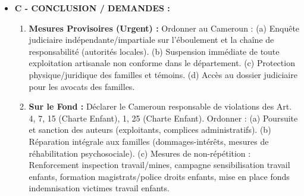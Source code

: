 \documentclass[11pt]{article}
\begin{document}
\begin{exoresolu}
\begin{itemize}
\begin{itemize}
            \end{itemize}
        \item \textbf{C - CONCLUSION / DEMANDES :}
            \begin{enumerate}
                \item \textbf{Mesures Provisoires (Urgent) :} Ordonner au Cameroun : (a) Enquête judiciaire indépendante/impartiale sur l'éboulement et la chaîne de responsabilité (autorités locales). (b) Suspension immédiate de toute exploitation artisanale non conforme dans le département. (c) Protection physique/juridique des familles et témoins. (d) Accès au dossier judiciaire pour les avocats des familles.
                \item \textbf{Sur le Fond :} Déclarer le Cameroun responsable de violations des Art. 4, 7, 15 (Charte Enfant), 1, 25 (Charte Enfant). Ordonner : (a) Poursuite et sanction des auteurs (exploitants, complices administratifs). (b) Réparation intégrale aux familles (dommages-intérêts, mesures de réhabilitation psychosociale). (c) Mesures de non-répétition : Renforcement inspection travail/mines, campagne sensibilisation travail enfants, formation magistrats/police droits enfants, mise en place fonds indemnisation victimes travail enfants.
            \end{enumerate}
    \end{itemize}
\end{exoresolu}
\end{document}
